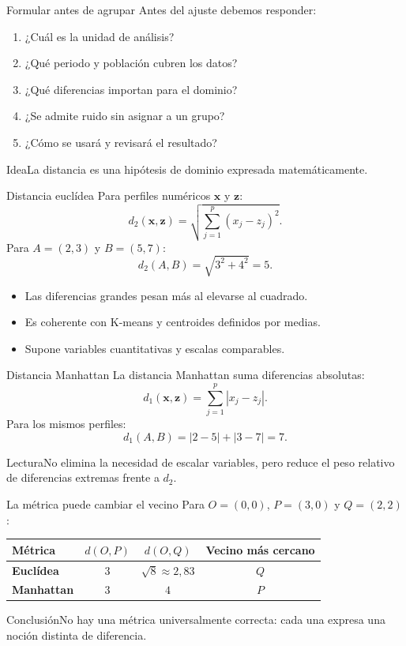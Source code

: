 \documentclass[aspectratio=169,10pt]{beamer}
\begin{document}
\begin{frame}{Formular antes de agrupar}
  \small
  Antes del ajuste debemos responder:
  \begin{enumerate}
    \item ¿Cuál es la unidad de análisis?
    \item ¿Qué periodo y población cubren los datos?
    \item ¿Qué diferencias importan para el dominio?
    \item ¿Se admite ruido sin asignar a un grupo?
    \item ¿Cómo se usará y revisará el resultado?
  \end{enumerate}
  \begin{block}{Idea}La distancia es una hipótesis de dominio expresada matemáticamente.\end{block}
\end{frame}

\begin{frame}{Distancia euclídea}
  \small
  Para perfiles numéricos $\mathbf{x}$ y $\mathbf{z}$:
  \[d_2(\mathbf{x},\mathbf{z})=\sqrt{\sum_{j=1}^{p}(x_j-z_j)^2}.\]
  Para $A=(2,3)$ y $B=(5,7)$:
  \[d_2(A,B)=\sqrt{3^2+4^2}=5.\]
  \begin{itemize}
    \item Las diferencias grandes pesan más al elevarse al cuadrado.
    \item Es coherente con K-means y centroides definidos por medias.
    \item Supone variables cuantitativas y escalas comparables.
  \end{itemize}
\end{frame}

\begin{frame}{Distancia Manhattan}
  \small
  La distancia Manhattan suma diferencias absolutas:
  \[d_1(\mathbf{x},\mathbf{z})=\sum_{j=1}^{p}|x_j-z_j|.\]
  Para los mismos perfiles:
  \[d_1(A,B)=|2-5|+|3-7|=7.\]
  \begin{block}{Lectura}No elimina la necesidad de escalar variables, pero reduce el peso relativo de diferencias extremas frente a $d_2$.\end{block}
\end{frame}

\begin{frame}{La métrica puede cambiar el vecino}
  \small
  Para $O=(0,0)$, $P=(3,0)$ y $Q=(2,2)$:
  \begin{tabularx}{\textwidth}{>{\bfseries}Xccc}\toprule
  Métrica & $d(O,P)$ & $d(O,Q)$ & Vecino más cercano\\\midrule
  Euclídea & $3$ & $\sqrt{8}\approx2{,}83$ & $Q$\\
  Manhattan & $3$ & $4$ & $P$\\\bottomrule
  \end{tabularx}
  \begin{alertblock}{Conclusión}No hay una métrica universalmente correcta: cada una expresa una noción distinta de diferencia.\end{alertblock}
\end{frame}
\end{document}
